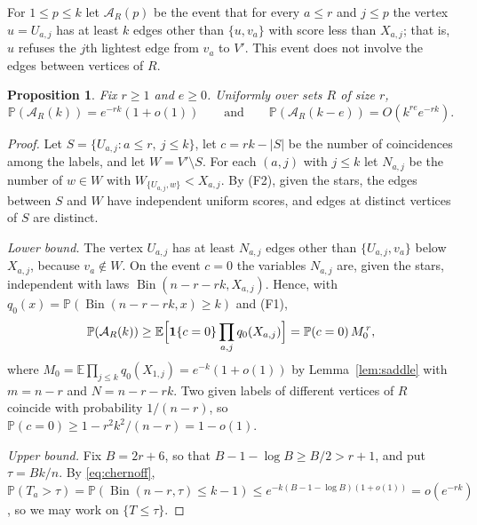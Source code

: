 \documentclass[11pt]{amsart}
\newtheorem{proposition}[theorem]{Proposition}
\theoremstyle{remark}
\numberwithin{equation}{section}
\newcommand{\E}{\mathbb E}
\newcommand{\Pp}{\mathbb P}
\newcommand{\Bin}{\operatorname{Bin}}
\newcommand{\1}{\mathbf 1}
\begin{document}
For $1\le p\le k$ let $\mathcal A_R(p)$ be the event that for every $a\le r$ and $j\le p$ the vertex $u=U_{a,j}$ has at least $k$ edges other than $\{u,v_a\}$ with score less than $X_{a,j}$; that is, $u$ refuses the $j$th lightest edge from $v_a$ to $V'$. This event does not involve the edges between vertices of $R$.

\begin{proposition}\label{prop:array}
Fix $r\ge1$ and $e\ge0$. Uniformly over sets $R$ of size $r$,
\[
\Pp(\mathcal A_R(k))=e^{-rk}(1+o(1))\qquad\text{and}\qquad\Pp(\mathcal A_R(k-e))=O(k^{re}e^{-rk}).
\]
\end{proposition}

\begin{proof}
Let $S=\{U_{a,j}:a\le r,\ j\le k\}$, let $c=rk-|S|$ be the number of coincidences among the labels, and let $W=V'\setminus S$. For each $(a,j)$ with $j\le k$ let $N_{a,j}$ be the number of $w\in W$ with $W_{\{U_{a,j},w\}}<X_{a,j}$. By (F2), given the stars, the edges between $S$ and $W$ have independent uniform scores, and edges at distinct vertices of $S$ are distinct.

\emph{Lower bound.} The vertex $U_{a,j}$ has at least $N_{a,j}$ edges other than $\{U_{a,j},v_a\}$ below $X_{a,j}$, because $v_a\notin W$. On the event $c=0$ the variables $N_{a,j}$ are, given the stars, independent with laws $\Bin(n-r-rk,X_{a,j})$. Hence, with $q_0(x)=\Pp(\Bin(n-r-rk,x)\ge k)$ and (F1),
\[
\Pp(\mathcal A_R(k))\ge\E\Bigl[\1\{c=0\}\prod_{a,j}q_0(X_{a,j})\Bigr]=\Pp(c=0)\,M_0^{\,r},
\]
where $M_0=\E\prod_{j\le k}q_0(X_{1,j})=e^{-k}(1+o(1))$ by Lemma~\ref{lem:saddle} with $m=n-r$ and $N=n-r-rk$. Two given labels of different vertices of $R$ coincide with probability $1/(n-r)$, so $\Pp(c=0)\ge1-r^2k^2/(n-r)=1-o(1)$.

\emph{Upper bound.} Fix $B=2r+6$, so that $B-1-\log B\ge B/2>r+1$, and put $\tau=Bk/n$. By \eqref{eq:chernoff}, $\Pp(T_a>\tau)=\Pp(\Bin(n-r,\tau)\le k-1)\le e^{-k(B-1-\log B)(1+o(1))}=o(e^{-rk})$, so we may work on $\{T\le\tau\}$.


\end{proof}
\end{document}
